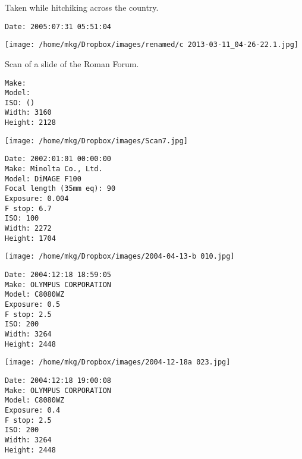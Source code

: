 \noindent Taken while hitchiking across the country.

\begin{lstlisting}
Date: 2005:07:31 05:51:04

\end{lstlisting}

\clearpage
\texttt{[image: /home/mkg/Dropbox/images/renamed/c 2013-03-11\_04-26-22.1.jpg]}

\clearpage

\noindent Scan of a slide of the Roman Forum.

\begin{lstlisting}
Make: 
Model: 
ISO: ()
Width: 3160
Height: 2128

\end{lstlisting}

\clearpage
\texttt{[image: /home/mkg/Dropbox/images/Scan7.jpg]}

\clearpage

\noindent 

\begin{lstlisting}
Date: 2002:01:01 00:00:00
Make: Minolta Co., Ltd.
Model: DiMAGE F100
Focal length (35mm eq): 90
Exposure: 0.004
F stop: 6.7
ISO: 100
Width: 2272
Height: 1704

\end{lstlisting}

\clearpage
\texttt{[image: /home/mkg/Dropbox/images/2004-04-13-b 010.jpg]}

\clearpage

\noindent 

\begin{lstlisting}
Date: 2004:12:18 18:59:05
Make: OLYMPUS CORPORATION
Model: C8080WZ
Exposure: 0.5
F stop: 2.5
ISO: 200
Width: 3264
Height: 2448

\end{lstlisting}

\clearpage
\texttt{[image: /home/mkg/Dropbox/images/2004-12-18a 023.jpg]}

\clearpage

\noindent 

\begin{lstlisting}
Date: 2004:12:18 19:00:08
Make: OLYMPUS CORPORATION
Model: C8080WZ
Exposure: 0.4
F stop: 2.5
ISO: 200
Width: 3264
Height: 2448

\end{lstlisting}

